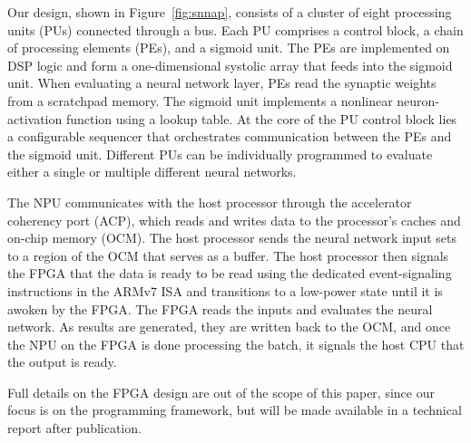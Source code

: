 Our design, shown in  Figure~\ref{fig:snnap}, consists of a cluster of eight processing units (PUs) connected through a bus.
Each PU comprises a control block, a chain of processing elements (PEs),
and a sigmoid unit. The PEs are implemented on DSP logic and form a one-dimensional systolic array that feeds into
the sigmoid unit. When evaluating a neural network layer, PEs read the
synaptic weights from a scratchpad memory.
The sigmoid unit implements a nonlinear neuron-activation function
using a lookup table. At the core of the PU control block lies a configurable sequencer that
orchestrates communication between the PEs and the sigmoid unit. Different
PUs can be individually programmed to evaluate either a single or multiple different neural networks.

% 
% 


The NPU communicates with
the host processor through the accelerator coherency
port (ACP), which reads and writes data to the
processor's caches and on-chip memory (OCM). The host processor sends the neural network input sets to a region of the OCM that serves as a buffer. 
The host processor then signals the FPGA that the data is ready to be read using
the dedicated event-signaling instructions in
the ARMv7 ISA and transitions to a low-power state until it is awoken by the FPGA.
The FPGA reads the inputs
and evaluates the neural network. As results are generated, they are written back to the OCM, and once the NPU on the FPGA is
done processing the batch, it signals the host CPU that the output is ready. 

Full details on the FPGA design are out of the scope of this paper, since our
focus is on the programming framework, but will be made available in a technical
report after publication.
\fi
